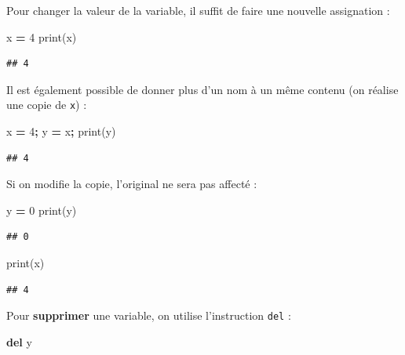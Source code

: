 \documentclass[
  12pt,
]{book}
\newenvironment{Shaded}{\begin{snugshade}}{\end{snugshade}}
\newcommand{\BuiltInTok}[1]{#1}
\newcommand{\DecValTok}[1]{\textcolor[rgb]{0.00,0.00,0.81}{#1}}
\newcommand{\KeywordTok}[1]{\textcolor[rgb]{0.13,0.29,0.53}{\textbf{#1}}}
\newcommand{\NormalTok}[1]{#1}
\newcommand{\OperatorTok}[1]{\textcolor[rgb]{0.81,0.36,0.00}{\textbf{#1}}}
\numberwithin{equation}{section}
\numberwithin{countremarque}{section}
\begin{document}
Pour changer la valeur de la variable, il suffit de faire une nouvelle assignation :

\begin{Shaded}
\begin{Highlighting}[]
\NormalTok{x }\OperatorTok{=} \DecValTok{4}
\BuiltInTok{print}\NormalTok{(x)}
\end{Highlighting}
\end{Shaded}

\begin{lstlisting}
## 4
\end{lstlisting}

Il est également possible de donner plus d'un nom à un même contenu (on réalise une copie de \texttt{x}) :

\begin{Shaded}
\begin{Highlighting}[]
\NormalTok{x }\OperatorTok{=} \DecValTok{4}\OperatorTok{;}
\NormalTok{y }\OperatorTok{=}\NormalTok{ x}\OperatorTok{;}
\BuiltInTok{print}\NormalTok{(y)}
\end{Highlighting}
\end{Shaded}

\begin{lstlisting}
## 4
\end{lstlisting}

Si on modifie la copie, l'original ne sera pas affecté :

\begin{Shaded}
\begin{Highlighting}[]
\NormalTok{y }\OperatorTok{=} \DecValTok{0}
\BuiltInTok{print}\NormalTok{(y)}
\end{Highlighting}
\end{Shaded}

\begin{lstlisting}
## 0
\end{lstlisting}

\begin{Shaded}
\begin{Highlighting}[]
\BuiltInTok{print}\NormalTok{(x)}
\end{Highlighting}
\end{Shaded}

\begin{lstlisting}
## 4
\end{lstlisting}

Pour \textbf{supprimer} une variable, on utilise l'instruction \texttt{del} :

\begin{Shaded}
\begin{Highlighting}[]
\KeywordTok{del}\NormalTok{ y}
\end{Highlighting}
\end{Shaded}
\end{document}
